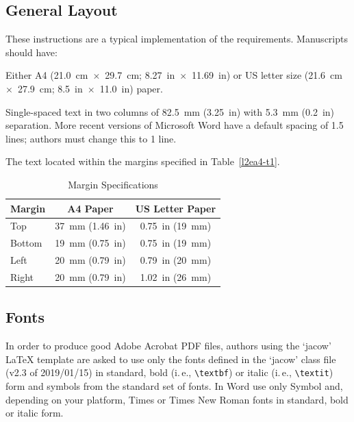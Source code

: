 \documentclass[a4paper,
               keeplastbox,   %
               ]{jacow}
\begin{document}
\subsection{General Layout}

These instructions are a typical implementation of the
requirements. Manuscripts should have:
\begin{Itemize}
    \item  Either A4 (\SI{21.0}{cm}~$\times$~\SI{29.7}{cm}; \SI{8.27}{in}~$\times$~\SI{11.69}{in}) or US
           letter size (\SI{21.6}{cm}~$\times$~\SI{27.9}{cm}; \SI{8.5}{in}~$\times$~\SI{11.0}{in}) paper.
    \item  Single-spaced text in two columns of \SI{82.5}{mm} (\SI{3.25}{in}) with \SI{5.3}{mm}
           (\SI{0.2}{in}) separation. More recent versions of Microsoft Word have a default spacing of 1.5 lines;
           authors must change this to 1 line.
    \item  The text located within the margins specified in Table~\ref{l2ea4-t1}.
\end{Itemize}
\begin{table}[!hbt]
   \centering
   \caption{Margin Specifications}
   \begin{tabular}{lcc}
       \toprule
       \textbf{Margin} & \textbf{A4 Paper}                      & \textbf{US Letter Paper} \\
       \midrule
           Top         & \SI{37}{mm} (\SI{1.46}{in})            & \SI{0.75}{in} (\SI{19}{mm})        \\ %
          Bottom       & \SI{19}{mm} (\SI{0.75}{in})            & \SI{0.75}{in} (\SI{19}{mm})        \\ %
           Left        & \SI{20}{mm} (\SI{0.79}{in})            & \SI{0.79}{in} (\SI{20}{mm})        \\ %
           Right       & \SI{20}{mm} (\SI{0.79}{in})            & \SI{1.02}{in} (\SI{26}{mm})        \\
       \bottomrule
   \end{tabular}
   \label{tab:margins}
\end{table}

\subsection{Fonts}

In order to produce good Adobe Acrobat PDF files, authors
using the `jacow' \LaTeX{} template are asked to use only the fonts
defined in the ‘jacow’ class file (v2.3 of 2019/01/15) in standard, 
bold (i.\,e., \verb|\textbf|) or italic (i.\,e., \verb|\textit|) form and
symbols from the standard set of fonts. In Word use only
Symbol and, depending on your platform, Times or Times New Roman
fonts in standard, bold or italic form.
\end{document}
